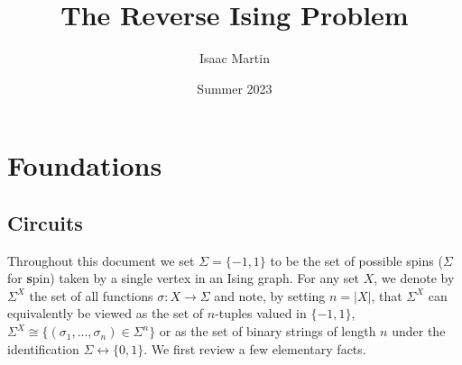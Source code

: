 \documentclass{article}
\begin{document}
\newpage
\title{The Reverse Ising Problem}
\author{Isaac Martin}
\date{Summer 2023}
\maketitle
\tableofcontents
\section{Foundations}

\subsection{Circuits}
Throughout this document we set $\Sigma = \{-1,1\}$ to be the set of possible spins ($\Sigma$ for \textbf{s}pin) taken by a single vertex in an Ising graph. For any set $X$, we denote by $\Sigma^X$ the set of all functions $\sigma: X\to \Sigma$ and note, by setting $n = |X|$, that $\Sigma^X$ can equivalently be viewed as the set of $n$-tuples valued in $\{-1, 1\}$, $\Sigma^X \cong \{(\sigma_1, ..., \sigma_n) \in \Sigma^n \}$ or as the set of binary strings of length $n$ under the identification $\Sigma \leftrightarrow \{0,1\}$. We first review a few elementary facts.
\end{document}
